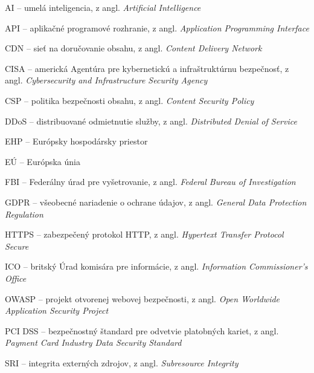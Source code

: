\noindent AI -- umelá inteligencia, z angl. \emph{\foreignlanguage{english}{Artificial Intelligence}}\par
\noindent API -- aplikačné programové rozhranie, z angl. \emph{\foreignlanguage{english}{Application Programming Interface}}\par
\noindent CDN -- sieť na doručovanie obsahu, z angl. \emph{\foreignlanguage{english}{Content Delivery Network}}\par
\noindent CISA -- americká Agentúra pre kybernetickú a infraštruktúrnu bezpečnosť, z angl. \emph{\foreignlanguage{english}{Cybersecurity and Infrastructure Security Agency}}\par
\noindent CSP -- politika bezpečnosti obsahu, z angl. \emph{\foreignlanguage{english}{Content Security Policy}}\par
\noindent DDoS -- distribuované odmietnutie služby, z angl. \emph{\foreignlanguage{english}{Distributed Denial of Service}}\par
\noindent EHP -- Európsky hospodársky priestor\par
\noindent EÚ -- Európska únia\par
\noindent FBI -- Federálny úrad pre vyšetrovanie, z angl. \emph{\foreignlanguage{english}{Federal Bureau of Investigation}}\par
\noindent GDPR -- všeobecné nariadenie o ochrane údajov, z angl. \emph{\foreignlanguage{english}{General Data Protection Regulation}}\par
\noindent HTTPS -- zabezpečený protokol HTTP, z angl. \emph{\foreignlanguage{english}{Hypertext Transfer Protocol Secure}}\par
\noindent ICO -- britský Úrad komisára pre informácie, z angl. \emph{\foreignlanguage{english}{Information Commissioner's Office}}\par
\noindent OWASP -- projekt otvorenej webovej bezpečnosti, z angl. \emph{\foreignlanguage{english}{Open Worldwide Application Security Project}}\par
\noindent PCI DSS -- bezpečnostný štandard pre odvetvie platobných kariet, z angl. \emph{\foreignlanguage{english}{Payment Card Industry Data Security Standard}}\par
\noindent SRI -- integrita externých zdrojov, z angl. \emph{\foreignlanguage{english}{Subresource Integrity}}\par
